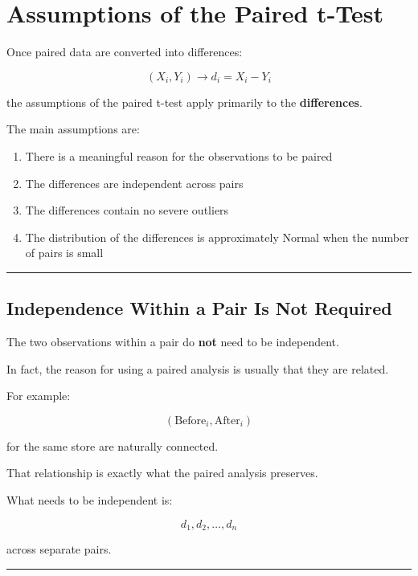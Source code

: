 \documentclass[
  letterpaper,
  DIV=11,
  numbers=noendperiod]{scrreprt}
\providecommand{\tightlist}{%
  \setlength{\itemsep}{0pt}\setlength{\parskip}{0pt}}
\begin{document}

\chapter{Assumptions of the Paired
t-Test}\label{assumptions-of-the-paired-t-test}

Once paired data are converted into differences:

\[
(X_i,Y_i)
\rightarrow
d_i=X_i-Y_i
\]

the assumptions of the paired t-test apply primarily to the
\textbf{differences}.

The main assumptions are:

\begin{enumerate}
\def\labelenumi{\arabic{enumi}.}
\tightlist
\item
  There is a meaningful reason for the observations to be paired
\item
  The differences are independent across pairs
\item
  The differences contain no severe outliers
\item
  The distribution of the differences is approximately Normal when the
  number of pairs is small
\end{enumerate}

\begin{center}\rule{0.5\linewidth}{0.5pt}\end{center}

\section{Independence Within a Pair Is Not
Required}\label{independence-within-a-pair-is-not-required}

The two observations within a pair do \textbf{not} need to be
independent.

In fact, the reason for using a paired analysis is usually that they are
related.

For example:

\[
(\text{Before}_i,\text{After}_i)
\]

for the same store are naturally connected.

That relationship is exactly what the paired analysis preserves.

What needs to be independent is:

\[
d_1,d_2,\ldots,d_n
\]

across separate pairs.

\begin{center}\rule{0.5\linewidth}{0.5pt}\end{center}
\end{document}
